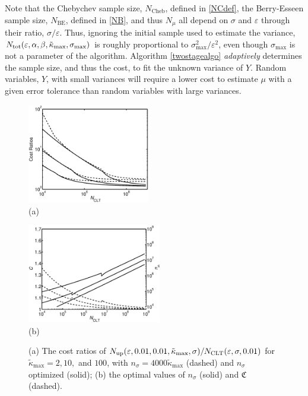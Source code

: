 \documentclass[graybox]{svmult}
\newcommand{\fudge}{\mathfrak{C}}
\newcommand{\tkappa}{\tilde{\kappa}}
\begin{document}
Note that the Chebychev sample size, $N_{\text{Cheb}}$, defined in \eqref{NCdef}, the Berry-Esseen sample size, $N_{\text{BE}}$, defined in \eqref{NB}, and thus $N_\mu$ all depend on $\sigma$ and $\varepsilon$ through their ratio, $\sigma/\varepsilon$.  Thus, ignoring the initial sample used to estimate the variance, $N_{\rm{tot}}(\varepsilon,\alpha, \beta,\tkappa_{\max}, \sigma_{\max})$ is roughly proportional to $\sigma^2_{\max}/\varepsilon^{2}$, even though $\sigma_{\max}$ is not a parameter of the algorithm.  Algorithm \ref{twostagealgo} \emph{adaptively} determines the sample size, and thus the cost, to fit the unknown variance of $Y$. Random variables, $Y$, with small variances will require a lower cost to estimate $\mu$ with a given error tolerance than random variables with large variances. 


\begin{figure}
\centering
\begin{minipage}{2.1in}
\centering \includegraphics[width=2.1in]{137MCSampleSizes} \\
(a)
\end{minipage}
\quad 
\begin{minipage}{2.3in}\centering
\includegraphics[width=2.3in]{137MCnsigmafudge}\\
(b)
\end{minipage}
\caption{(a) The cost ratios of $N_{\rm{up}}(\varepsilon,0.01,0.01, \tkappa_{\max}, \sigma)/N_{\mathrm{CLT}}(\varepsilon,\sigma,0.01)$ for $\tkappa_{\max}=2, 10,$ and $100$, with $n_\sigma=4000\tkappa_{\max}$ (dashed) and $n_\sigma$ optimized (solid); (b) the optimal values of $n_\sigma$ (solid) and $\fudge$ (dashed).\label{Costfig}}
\end{figure}
\end{document}
